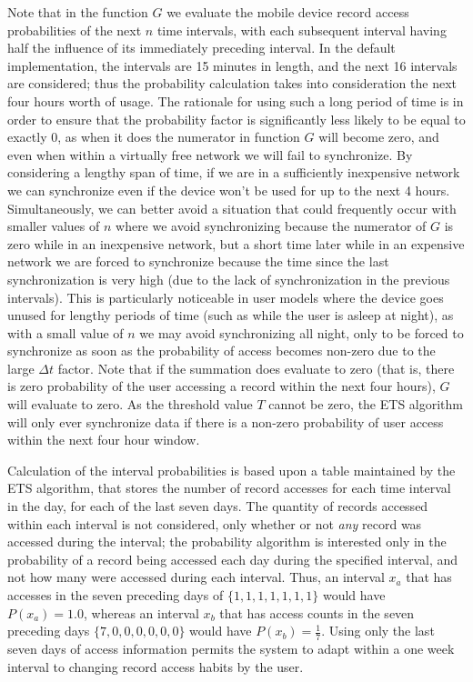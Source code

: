 Note that in the function $G$ we evaluate the mobile device record access probabilities of the next $n$ time intervals, with each subsequent interval having half the influence of its immediately preceding interval.  In the default implementation, the intervals are 15 minutes in length, and the next 16 intervals are considered; thus the probability calculation takes into consideration the next four hours worth of usage.  The rationale for using such a long period of time is in order to ensure that the probability factor is significantly less likely to be equal to exactly $0$, as when it does the numerator in function $G$ will become zero, and even when within a virtually free network we will fail to synchronize. By considering a lengthy span of time, if we are in a sufficiently inexpensive network we can synchronize even if the device won't be used for up to the next 4 hours.  Simultaneously, we can better avoid a situation that could frequently occur with smaller values of $n$ where we avoid synchronizing because the numerator of $G$ is zero while in an inexpensive network, but a short time later while in an expensive network we are forced to synchronize because the time since the last synchronization is very high (due to the lack of synchronization in the previous intervals).  This is particularly noticeable in user models where the device goes unused for lengthy periods of time (such as while the user is asleep at night), as with a small value of $n$ we may avoid synchronizing all night, only to be forced to synchronize as soon as the probability of access becomes non-zero due to the large $\Delta t$ factor.  Note that if the summation does evaluate to zero (that is, there is zero probability of the user accessing a record within the next four hours), $G$ will evaluate to zero.  As the threshold value $T$ cannot be zero, the ETS algorithm will only ever synchronize data if there is a non-zero probability of user access within the next four hour window.

Calculation of the interval probabilities is based upon a table maintained by the ETS algorithm, that stores the number of record accesses for each time interval in the day, for each of the last seven days.  The quantity of records accessed within each interval is not considered, only whether or not \emph{any} record was accessed during the interval; the probability algorithm is interested only in the probability of a record being accessed each day during the specified interval, and not how many were accessed during each interval.  Thus, an interval $x_a$ that has accesses in the seven preceding days of $\{1, 1, 1, 1, 1, 1, 1\}$ would have $P(x_a) = 1.0$, whereas an interval $x_b$ that has access counts in the seven preceding days $\{7, 0, 0, 0, 0, 0, 0\}$ would have $P(x_b) =  \frac{1}{7}$.  Using only the last seven days of access information permits the system to adapt within a one week interval to changing record access habits by the user.

